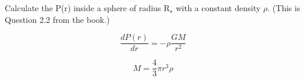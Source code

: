 \documentclass[12pt]{article}
\newenvironment{problem}[2][Problem]{\begin{trivlist}
\item[\hskip \labelsep {\bfseries #1}\hskip \labelsep {\bfseries #2.}]}{\end{trivlist}}
\newenvironment{answer}[2][Answer]{\begin{trivlist}
\item[\hskip \labelsep {\bfseries #1}\hskip \labelsep {\bfseries #2.}]}{\end{trivlist}}
\begin{document}
\begin{answer}{3}

\end{answer}
\bigskip
\bigskip




\begin{problem}{4}
Calculate the P(r) inside a sphere of radius R$_\star$ with a constant density $\rho$. (This is Question 2.2 from the book.)
\end{problem}

\begin{answer}{4}


\begin{equation}
  \frac{dP(r)}{dr} = -\rho \frac{GM}{r^2}
\end{equation}

\begin{equation}
  M = \frac{4}{3} \pi r^3 \rho
\end{equation}



\end{answer}
\bigskip
\bigskip
\end{document}
